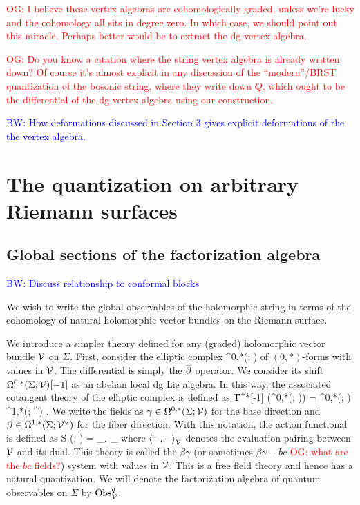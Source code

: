 \documentclass[10pt]{amsart}
\def\brian{\textcolor{blue}{BW: }\textcolor{blue}}
\def\owen{\textcolor{red}{OG: }\textcolor{red}}
\begin{document}
\owen{I believe these vertex algebras are cohomologically graded, unless we're lucky and the cohomology all sits in degree zero. In which case, we should point out this miracle. Perhaps better would be to extract the dg vertex algebra.}

\owen{Do you know a citation where the string vertex algebra is already written down? Of course it's almost explicit in any discussion of the ``modern''/BRST quantization of the bosonic string, where they write down $Q$, which ought to be the differential of the dg vertex algebra using our construction.}

\brian{How deformations discussed in Section 3 gives explicit deformations of the the vertex algebra.}

\section{The quantization on arbitrary Riemann surfaces} 

\subsection{Global sections of the factorization algebra}

\brian{Discuss relationship to conformal blocks}

We wish to write the global observables of the holomorphic string in terms of the cohomology of natural holomorphic vector bundles on the Riemann surface. 

We introduce a simpler theory defined for any (graded) holomorphic vector bundle $\mathcal{V}$ on $\Sigma$. First, consider the elliptic complex
\ben
\Omega^{0,*}(\Sigma ; \cV)
\een
of $(0,*)$-forms with values in $\mathcal{V}$. The differential is simply the $\overline{\partial}$ operator. We consider its shift $\Omega^{0,*}(\Sigma ; \mathcal{V})[-1]$ as an abelian local dg Lie algebra. In this way, the associated cotangent theory of the elliptic complex is defined as 
\ben
T^{*}[-1] (\Omega^{0,*}(\Sigma ; \cV)) = \Omega^{0,*}(\Sigma ; \cV) \oplus \Omega^{1,*}(\Sigma ; \cV^\vee) .
\een 
We write the fields as $\gamma \in \Omega^{0,*}(\Sigma ; \mathcal{V})$ for the base direction and $\beta \in \Omega^{1,*}(\Sigma ; \mathcal{V}^\vee)$ for the fiber direction. With this notation, the action functional is defined as
\ben
S (\beta, \gamma) = \int_\Sigma \<\beta, \dbar \gamma\>_\cV
\een
where $\left\langle-,-\right\rangle_{\mathcal{V}}$ denotes the evaluation pairing between $\mathcal{V}$ and its dual. This theory is called the $\beta\gamma$ (or sometimes $\beta \gamma-bc$ \owen{what are the $bc$ fields?}) system with values in $\mathcal{V}$. This is a free field theory and hence has a natural quantization. We will denote the factorization algebra of quantum observables on $\Sigma$ by ${\rm Obs}^{q}_{\mathcal{V}}$. 
\end{document}
